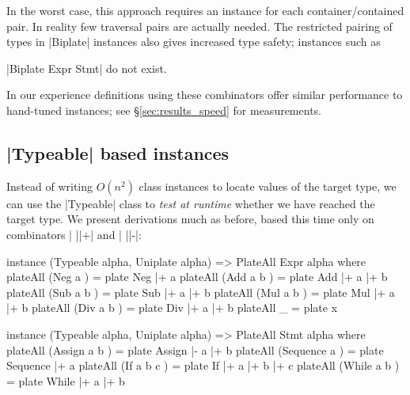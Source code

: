 In the worst case, this approach requires an instance for each container/contained pair. In reality few traversal pairs are actually needed. The restricted pairing of types in |Biplate| instances also gives increased type safety; instances such as \ignore|Biplate Expr Stmt| do not exist.

In our experience definitions using these combinators offer similar performance to hand-tuned instances; see \S\ref{sec:results_speed} for measurements.


\subsection{|Typeable| based instances}
\label{sec:implement_playtypeable}

Instead of writing $O(n^2)$ class instances to locate values of the target type, we can use the |Typeable| class to \textit{test at runtime} whether we have reached the target type. We present derivations much as before, based this time only on combinators | ||+| and | ||-|:

\begin{comment}
\begin{code}
type Type from to = ([to] -> [to], [to] -> (from,[to]))
uniplateAll :: PlateAll a b => a -> ([b],[b] -> a)
class PlateAll from to where
    plateAll :: from -> Type from to
plate :: from -> Type from to
(|+) :: (Typeable item, Typeable to, PlateAll item to) => Type (item -> from) to -> item -> Type from to
(|-) :: Type (item -> from) to -> item -> Type from to
instance (PlateAll from to, Typeable from, Typeable to, Uniplate to) => PlateAll [from] to where
\end{code}
\end{comment}

\begin{code}
instance (Typeable alpha, Uniplate alpha) => PlateAll Expr alpha where
    plateAll (Neg a    )  = plate Neg  |+ a
    plateAll (Add a b  )  = plate Add  |+ a |+ b
    plateAll (Sub a b  )  = plate Sub  |+ a |+ b
    plateAll (Mul a b  )  = plate Mul  |+ a |+ b
    plateAll (Div a b  )  = plate Div  |+ a |+ b
    plateAll _            = plate x

instance (Typeable alpha, Uniplate alpha) => PlateAll Stmt alpha where
    plateAll (Assign    a b    ) = plate Assign    |-  a |+ b
    plateAll (Sequence  a      ) = plate Sequence  |+  a
    plateAll (If        a b c  ) = plate If        |+  a |+ b |+ c
    plateAll (While     a b    ) = plate While     |+  a |+ b
\end{code}

